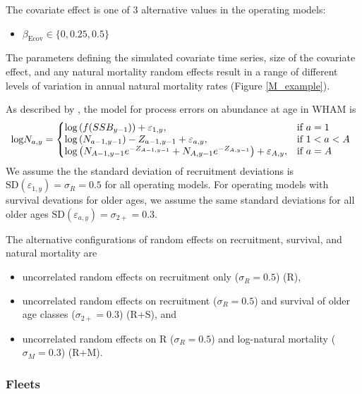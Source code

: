 \documentclass[
  12pt,
]{article}
\begin{document}
The covariate effect is one of 3 alternative values in the operating
models:

\begin{itemize}
\item $\beta_\text{Ecov} \in \{0,0.25,0.5\}$
\end{itemize}

The parameters defining the simulated covariate time series, size of the
covariate effect, and any natural mortality random effects result in a
range of different levels of variation in annual natural mortality rates
(Figure \ref{M_example}).

As described by \citet{stockmiller21}, the model for process errors on
abundance at age in WHAM is \begin{equation}
  \text{log}N_{a,y}=\left\{
    \begin{array}{@{}lll@{}}
      \text{log} \left( f(SSB_{y-1}) \right) + \varepsilon_{1,y}, & \text{if}\ a = 1 \\
      \text{log} \left( N_{a-1,y-1} \right) - Z_{a-1,y-1} + \varepsilon_{a,y}, & \text{if}\ 1 < a < A \\
      \text{log} \left( N_{A-1,y-1} e^{-Z_{A-1,y-1}} + N_{A,y-1} e^{-Z_{A,y-1}} \right) + \varepsilon_{A,y}, & \text{if}\ a = A
    \end{array}\right.
\end{equation} We assume the the standard deviation of recruitment
deviations is
\(\text{SD}\left(\varepsilon_{1,y}\right) = \sigma_R = 0.5\) for all
operating models. For operating models with survival devations for older
ages, we assume the same standard deviations for all older ages
\(\text{SD}\left(\varepsilon_{a,y}\right) = \sigma_{2+} = 0.3\).

The alternative configurations of random effects on recruitment,
survival, and natural mortality are

\begin{itemize}
\item uncorrelated random effects on recruitment only ($\sigma_R = 0.5$) (R),
\item uncorrelated random effects on recruitment ($\sigma_R = 0.5$) and survival of older age classes ($\sigma_{2+} = 0.3$) (R+S), and
\item uncorrelated random effects on R ($\sigma_R = 0.5$) and log-natural mortality ($\sigma_M = 0.3$) (R+M).
\end{itemize}

\hypertarget{fleets}{%
\subsubsection*{Fleets}\label{fleets}}
\end{document}
